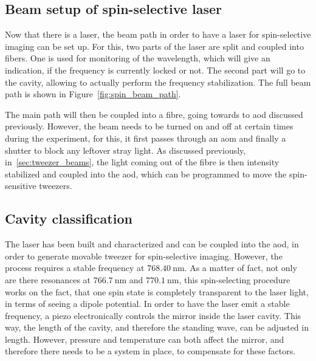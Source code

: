 \subsection{Beam setup of spin-selective laser}

Now that there is a laser, the beam path in order to have a laser for spin-selective imaging can be set up. For this, two parts of the laser are split and coupled into fibers. One is used for monitoring of the wavelength, which will give an indication, if the frequency is currently locked or not. The second part will go to the cavity, allowing to actually perform the frequency stabilization. The full beam path is shown in Figure~\ref{fig:spin_beam_path}.

\begin{figure}[t]%
\end{figure}

The main path will then be coupled into a fibre, going towards to \ac{aod} discussed previously. However, the beam needs to be turned on and off at certain times during the experiment, for this, it first passes through an \ac{aom} and finally a shutter to block any leftover stray light. As discussed previously, in~\ref{sec:tweezer_beams}, the light coming out of the fibre is then intensity stabilized and coupled into the \ac{aod}, which can be programmed to move the spin-sensitive tweezers.

\subsection{Cavity classification}

The laser has been built and characterized and can be coupled into the \ac{aod}, in order to generate movable tweezer for spin-selective imaging. However, the process requires a stable frequency at $\SI{768.40}{\nano\meter}$. As a matter of fact, not only are there resonances at $\SI{766.7}{\nano\meter}$ and $\SI{770.1}{\nano\meter}$, this spin-selecting procedure works on the fact, that one spin state is completely transparent to the laser light, in terms of seeing a dipole potential. In order to have the laser emit a stable frequency, a piezo electronically controls the mirror inside the laser cavity. This way, the length of the cavity, and therefore the standing wave, can be adjusted in length. However, pressure and temperature can both affect the mirror, and therefore there needs to be a system in place, to compensate for these factors.

